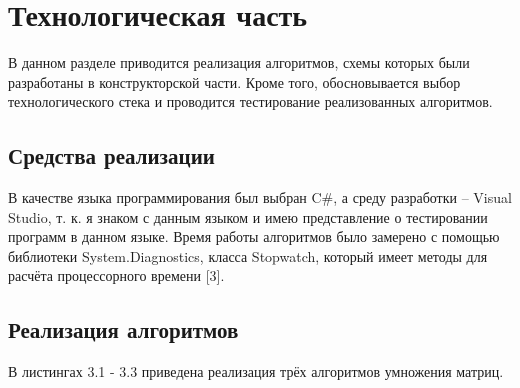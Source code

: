 \documentclass[12pt]{report}
\begin{document}
\newpage

\chapter{Технологическая часть}
В данном разделе приводится реализация алгоритмов, схемы которых были разработаны в конструкторской части. Кроме того, обосновывается выбор технологического стека и проводится тестирование реализованных алгоритмов.

\section{Средства реализации}

В качестве языка программирования был выбран C\#, а среду разработки -- Visual Studio, т. к. я знаком с данным языком и имею представление о тестировании программ в данном языке. Время работы алгоритмов было замерено с помощью библиотеки System.Diagnostics, класса Stopwatch, который имеет методы для расчёта процессорного времени [3].


\section{Реализация алгоритмов}

В листингах 3.1 - 3.3 приведена реализация трёх алгоритмов умножения матриц.
\end{document}
